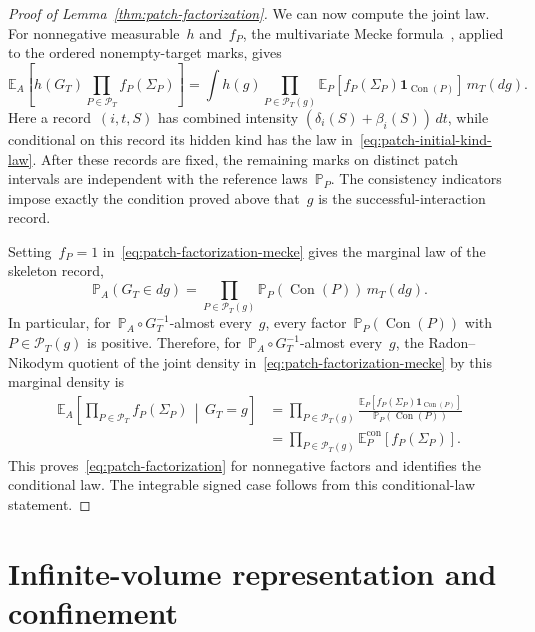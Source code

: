 \documentclass[EJP,preprint,NODS,nobera]{ejpecp}
\newcommand{\pP}{\mathbb{P}}
\newcommand{\E}{\mathbb{E}}
\newcommand{\bb}[1]{\left(#1\right)}
\newcommand{\Cb}[1]{\left[#1\right]}
\newcommand{\ind}{\mathbf{1}}
\newcommand{\rev}[1]{{\color{red}#1}}
\begin{document}
\begin{proof}[Proof of Lemma~\ref{thm:patch-factorization}]
We can now compute the joint law. For nonnegative measurable~$h$ and~$f_P$, the
multivariate Mecke formula~\cite[Theorem~4.4]{LastPenrose2017}, applied to the
ordered nonempty-target marks, gives
\begin{equation}
\label{eq:patch-factorization-mecke}
\E_A\Cb{
h(G_T)
\prod_{P\in\mathcal P_T}f_P\bb{\Sigma_P}
}
=
\int h(g)
\prod_{P\in\mathcal P_T(g)}
\E_P\Cb{
f_P\bb{\Sigma_P}\ind_{\operatorname{Con}(P)}
}
\,m_T(dg).
\end{equation}
Here a record~$(i,t,S)$ has combined intensity
$\bb{\delta_i(S)+\beta_i(S)}\,dt$, while conditional on this record its
hidden kind has the law in~\eqref{eq:patch-initial-kind-law}. After these
records are fixed, the remaining marks on distinct patch intervals are
independent with the reference laws~$\pP_P$. The consistency indicators impose
exactly the condition proved above that~$g$ is the successful-interaction
record.

Setting~$f_P=1$ in~\eqref{eq:patch-factorization-mecke} gives the marginal law
of the skeleton record,
\begin{equation*}
\pP_A\bb{G_T\in dg}
=
\prod_{P\in\mathcal P_T(g)}
\pP_P\bb{\operatorname{Con}(P)}
\,m_T(dg).
\end{equation*}
In particular, for~$\pP_A\circ G_T^{-1}$-almost every~$g$, every
factor~$\pP_P\bb{\operatorname{Con}(P)}$ with~$P\in\mathcal P_T(g)$ is
positive. Therefore, for~$\pP_A\circ G_T^{-1}$-almost every~$g$, the Radon--Nikodym
quotient of the joint density in~\eqref{eq:patch-factorization-mecke} by this
marginal density is
\begin{align*}
\E_A\Cb{
\prod_{P\in\mathcal P_T}f_P\bb{\Sigma_P}
\,\middle|\,G_T=g
}
&=
\prod_{P\in\mathcal P_T(g)}
\frac{
\E_P\Cb{f_P\bb{\Sigma_P}\ind_{\operatorname{Con}(P)}}
}{
\pP_P\bb{\operatorname{Con}(P)}
}
\\
&=
\prod_{P\in\mathcal P_T(g)}
\E_P^{\mathrm{con}}\Cb{f_P\bb{\Sigma_P}}.
\end{align*}
This proves~\eqref{eq:patch-factorization} for nonnegative factors and
identifies the conditional law. The integrable signed case follows from this
conditional-law statement.
\end{proof}

\section{\texorpdfstring{\rev{Infinite-volume representation and confinement}}{Infinite-volume representation and confinement}}
\label{app:spatial-confinement}
\end{document}
